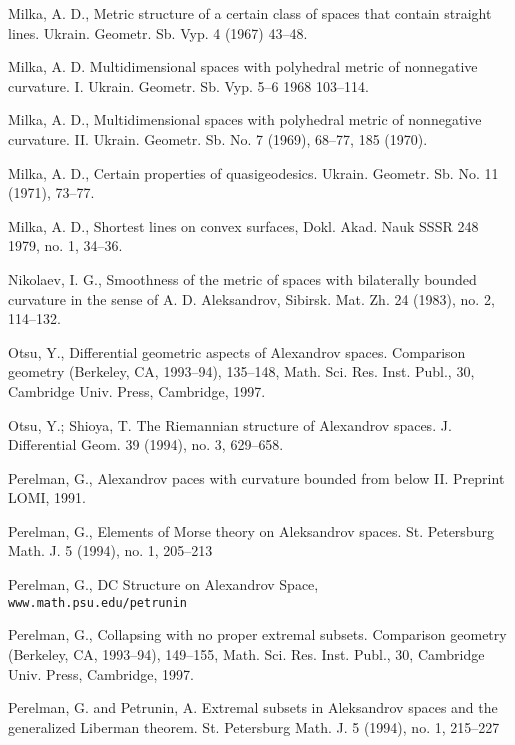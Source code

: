 \documentclass{article}
\begin{document}
\begin{thebibliography}{Bibliography}
Milka, A. D., 
Metric structure of a certain class of spaces that contain straight lines.  Ukrain. Geometr. Sb. Vyp.  4  (1967) 43--48.

Milka, A. D. 
Multidimensional spaces with polyhedral
metric of nonnegative curvature. I. 
Ukrain. Geometr. Sb. Vyp.  5--6 
1968 103--114. 

Milka, A. D., 
Multidimensional spaces with polyhedral
metric of nonnegative curvature. II. 
Ukrain. Geometr. Sb. No. 7
(1969), 68--77, 185 (1970).

Milka, A. D., 
Certain properties of quasigeodesics. 
Ukrain. Geometr. Sb. No. 11 (1971), 73--77.

Milka, A. D., 
Shortest lines on convex surfaces,  
Dokl. Akad. Nauk SSSR  {248}  {1979}, {no. 1}, {34--36}.


Nikolaev, I. G., 
Smoothness of the metric of spaces with bilaterally bounded curvature
in the sense of A. D. Aleksandrov, 
Sibirsk. Mat. Zh. 24 (1983), no. 2, 114--132.

Otsu, Y.,
Differential geometric aspects of Alexandrov spaces.  
Comparison
geometry (Berkeley, CA, 1993--94),  
135--148, Math. Sci. Res. Inst. Publ., 30,
Cambridge Univ. Press, Cambridge, 1997.

Otsu, Y.; Shioya, T. The Riemannian structure of Alexandrov spaces.  J.
Differential Geom.  39  (1994),  no. 3, 629--658.

Perelman, G., 
Alexandrov paces with curvature
bounded from below II. 
Preprint LOMI, 1991.

Perelman, G., 
Elements of Morse theory on
Aleksandrov spaces.  St. Petersburg Math. J.  5  (1994),  no. 1, 205--213

Perelman, G., 
DC Structure on Alexandrov Space,\\ {\tt www.math.psu.edu/petrunin}

Perelman, G., 
Collapsing with no proper
extremal subsets.  Comparison geometry (Berkeley, CA, 1993--94),  149--155,
Math. Sci. Res. Inst. Publ., 30, Cambridge Univ. Press, Cambridge, 1997.

Perelman, G. and   Petrunin, A. 
Extremal subsets in Aleksandrov spaces and the generalized Liberman theorem.
St. Petersburg Math. J.  5  (1994),  no. 1, 215--227


\end{thebibliography}
\end{document}
